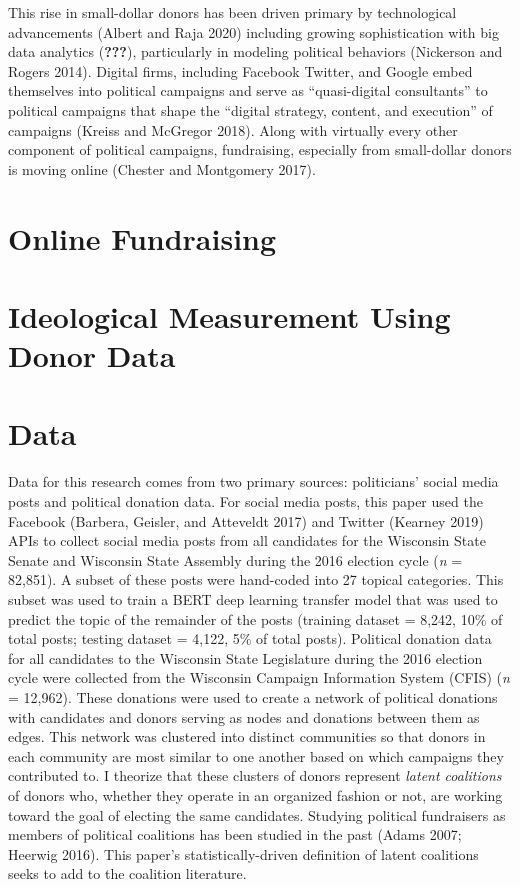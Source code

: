 \documentclass[12pt,]{article}
\begin{document}
This rise in small-dollar donors has been driven primary by
technological advancements (Albert and Raja 2020) including growing
sophistication with big data analytics ({\textbf{???}}), particularly in
modeling political behaviors (Nickerson and Rogers 2014). Digital firms,
including Facebook Twitter, and Google embed themselves into political
campaigns and serve as ``quasi-digital consultants'' to political
campaigns that shape the ``digital strategy, content, and execution'' of
campaigns (Kreiss and McGregor 2018). Along with virtually every other
component of political campaigns, fundraising, especially from
small-dollar donors is moving online (Chester and Montgomery 2017).

\hypertarget{online-fundraising}{%
\section{Online Fundraising}\label{online-fundraising}}

\hypertarget{ideological-measurement-using-donor-data}{%
\section{Ideological Measurement Using Donor
Data}\label{ideological-measurement-using-donor-data}}

\hypertarget{data}{%
\section{Data}\label{data}}

Data for this research comes from two primary sources: politicians'
social media posts and political donation data. For social media posts,
this paper used the Facebook (Barbera, Geisler, and Atteveldt 2017) and
Twitter (Kearney 2019) APIs to collect social media posts from all
candidates for the Wisconsin State Senate and Wisconsin State Assembly
during the 2016 election cycle (\emph{n} = 82,851). A subset of these
posts were hand-coded into 27 topical categories. This subset was used
to train a BERT deep learning transfer model that was used to predict
the topic of the remainder of the posts (training dataset = 8,242, 10\%
of total posts; testing dataset = 4,122, 5\% of total posts). Political
donation data for all candidates to the Wisconsin State Legislature
during the 2016 election cycle were collected from the Wisconsin
Campaign Information System (CFIS) (\emph{n} = 12,962). These donations
were used to create a network of political donations with candidates and
donors serving as nodes and donations between them as edges. This
network was clustered into distinct communities so that donors in each
community are most similar to one another based on which campaigns they
contributed to. I theorize that these clusters of donors represent
\emph{latent coalitions} of donors who, whether they operate in an
organized fashion or not, are working toward the goal of electing the
same candidates. Studying political fundraisers as members of political
coalitions has been studied in the past (Adams 2007; Heerwig 2016). This
paper's statistically-driven definition of latent coalitions seeks to
add to the coalition literature.
\end{document}
